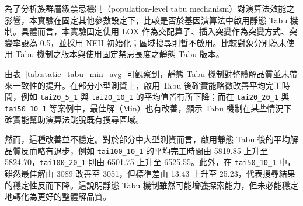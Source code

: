 \documentclass[conference]{IEEEtran}
\begin{document}
為了分析族群層級禁忌機制（population-level tabu mechanism）對演算法效能之影響，本實驗在固定其他參數設定下，比較是否於基因演算法中啟用靜態 Tabu 機制。具體而言，本實驗固定使用 LOX 作為交配算子、插入突變作為突變方式、突變率設為 0.5，並採用 NEH 初始化；區域搜尋則暫不啟用。比較對象分別為未使用 Tabu 機制之版本與使用固定禁忌長度之靜態 Tabu 版本。

\begin{table}[htbp]
\caption{比較有無static tabu mechanism之平均與最小Makespan}
\label{tab:static_tabu_min_avg}
\centering
{}
\end{table}

由表~\ref{tab:static_tabu_min_avg} 可觀察到，靜態 Tabu 機制對整體解品質並未帶來一致性的提升。在部分小型測資上，啟用 Tabu 後確實能略微改善平均完工時間，例如 \texttt{tai20\_5\_1} 與 \texttt{tai20\_10\_1} 的平均值皆有所下降；而在 \texttt{tai20\_20\_1} 與 \texttt{tai50\_10\_1} 等案例中，最佳解（Min）也有改善，顯示 Tabu 機制在某些情況下確實能幫助演算法跳脫既有搜尋區域。

然而，這種改善並不穩定。對於部分中大型測資而言，啟用靜態 Tabu 後的平均解品質反而略有退步，例如 \texttt{tai100\_10\_1} 的平均完工時間由 5819.85 上升至 5824.70，\texttt{tai100\_20\_1} 則由 6501.75 上升至 6525.55。此外，在 \texttt{tai50\_10\_1} 中，雖然最佳解由 3089 改善至 3051，但標準差由 13.43 上升至 25.23，代表搜尋結果的穩定性反而下降。這說明靜態 Tabu 機制雖然可能增強探索能力，但未必能穩定地轉化為更好的整體解品質。
\end{document}
